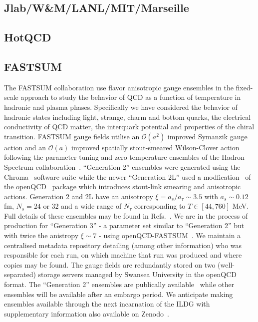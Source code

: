 \documentclass[a4paper,11pt]{article}
\begin{document}
\subsection{Jlab/W\&M/LANL/MIT/Marseille}
\newpage
\subsection{HotQCD}

\subsection{FASTSUM}
The FASTSUM collaboration use  flavor anisotropic gauge ensembles in the fixed-scale approach to study the behavior of QCD as a function of temperature in hadronic and plasma phases. Specifically we have considered the behavior of hadronic states including light, strange, charm and bottom quarks, the electrical conductivity of QCD matter, the interquark potential and properties of the chiral transition. %
FASTSUM gauge fields utilise an $\mathcal{O}\left(a^2\right)$ improved Symanzik gauge action and an $\mathcal{O}\left(a\right)$ improved spatially stout-smeared Wilson-Clover action following the parameter tuning and zero-temperature ensembles of the Hadron Spectrum collaboration~\cite{Edwards:2008ja,HadronSpectrum:2008xlg}. ``Generation 2'' ensembles were generated using the Chroma~\cite{Edwards:2004sx} software suite while the newer ``Generation 2L'' used a modfication~\cite{glesaaen_jonas_rylund_2018_2216355} of the {\sc openQCD}~\cite{Luscher:2012av,openqcd} package which introduces stout-link smearing and anisotropic actions. Generation 2 and 2L have an anisotropy $\xi = a_s/a_\tau \sim 3.5$ with $a_s\sim 0.12$ fm, $N_s = 24$ or $32$ and a wide range of $N_\tau$ corresponding to $T \in[44,760]$ MeV. %
Full details of these ensembles may be found in Refs.~\cite{Aarts:2014nba,Aarts:2020vyb}. We are in the process of production for ``Generation 3'' - a parameter set similar to ``Generation 2'' but with twice the anistropy $\xi \sim 7$ - using {\sc openQCD-FASTSUM}~\cite{glesaaen_jonas_rylund_2018_2216355}. %
We maintain a centralised metadata repository detailing (among other information) who was responsible for each run, on which machine that run was produced and where copies may be found. The gauge fields are redundantly stored on two (well-separated) storage servers managed by Swansea University in the openQCD format. The ``Generation 2'' ensembles are publically available~\cite{aarts_2024_8403827} while other ensembles will be available after an embargo period. We anticipate making ensembles available through the next incarnation of the ILDG with supplementary information also available on Zenodo~\cite{zenodo,aarts_2024_8403827}.
\end{document}
